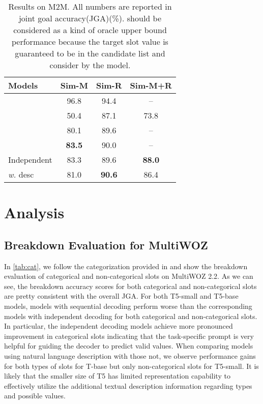 \documentclass[11pt]{article}
\begin{document}
\begin{table}[t]
    \small
    \centering

    \begin{tabular}{lccc}
    \toprule
        \textbf{Models}  &  \textbf{Sim-M} & \textbf{Sim-R} & \textbf{Sim-M+R} \\
        \midrule
        \cite{rastogi2017scalable} & 96.8 & 94.4 & --  \\
        \midrule
         \cite{rastogi2018multi} & 50.4 & 87.1  & 73.8 \\
         \cite{chao2019bert} & 80.1 & 89.6 & --  \\
         \cite{heck2020trippy} & \textbf{83.5} & 90.0 & -- \\
         \midrule
Independent &  83.3 & 89.6 &  \textbf{88.0}  \\
        \quad \textit{w.} desc & 81.0 & \textbf{90.6} & 86.4  \\
        \bottomrule
    \end{tabular}
        \caption{Results on M2M. All numbers are reported in joint goal accuracy(JGA)(\%). \cite{rastogi2017scalable} should be considered as a kind of oracle upper bound performance because the target slot value is guaranteed to be in the candidate list and consider by the model.}
    \label{tab:m2m}
\end{table}


 
\section{Analysis}
\subsection{Breakdown Evaluation for MultiWOZ}
In \autoref{tab:cat}, we follow the categorization provided in \cite{zang2020multiwoz} and show the breakdown evaluation of categorical and non-categorical slots on MultiWOZ 2.2. 
As we can see, the breakdown accuracy scores for both categorical and non-categorical slots are pretty consistent with the overall JGA.
For both T5-small and T5-base models, models with sequential decoding perform worse than the corresponding models with independent decoding for both categorical and non-categorical slots.
In particular, the independent decoding models achieve more pronounced improvement in categorical slots indicating that the task-specific prompt is very helpful for guiding the decoder to predict valid values. 
When comparing models using natural language description with those not, we observe performance gains for both types of slots for T-base but only non-categorical slots for T5-small. It is likely that the smaller size of T5 has limited representation capability to effectively utilize the additional textual description information regarding types and possible values. 
\end{document}
